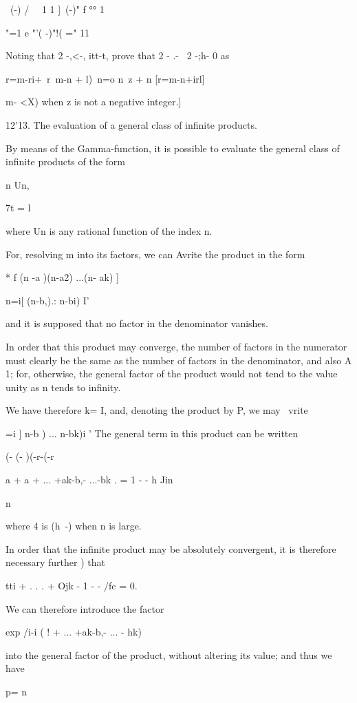 \ (-) / \ \ 1 1 ]\ (-)" f °° 1

"=1 e "'( -)"!( =" 11

Noting that 2 -,<-, itt-t, prove that 2 - .- \ 2 -;h- 0 as

r=m-ri+\ r\ m-n + l)\ n=o n\ z + n [r=m-n+irl]

m- <X) when z is not a negative integer.]

12'13. The evaluation of a general class of infinite products.

By means of the Gamma-function, it is possible to evaluate the general
class of infinite products of the form

n Un,

7t = l

where Un is any rational function of the index n.

For, resolving m into its factors, we can Avrite the product in the
form

* f (n -a )(n-a2) ...(n- ak) ]

n=i[ (n-b,).: n-bi) I'

and it is supposed that no factor in the denominator vanishes.

In order that this product may converge, the number of factors in the
numerator must clearly be the same as the number of factors in the
denominator, and also A 1; for, otherwise, the general factor of the
product would not tend to the value unity as n tends to infinity.

We have therefore k= I, and, denoting the product by P, we may \ vrite

 =i ] n-b ) ... n-bk)i ' The general term in this product can be
written

(- (- )(-r-(-r

a + a + ... +ak-b,- ...-bk . = 1 - - h Jin

n

where 4 is (h~-) when n is large.

In order that the infinite product may be absolutely convergent, it is
therefore necessary further ) that

tti + . . . + Ojk - 1 -   - /fc = 0.

%
%

We can therefore introduce the factor

exp /i-i ( ! + ... +ak-b,- ... - hk)

into the general factor of the product, without altering its value;
and thus we have

p= n

